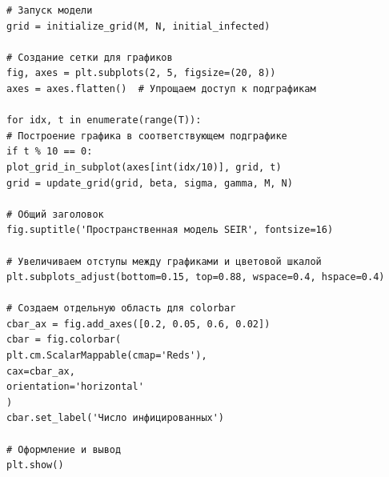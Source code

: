 \documentclass[a4paper, 14pt]{extreport}
\begin{document}
\begin{verbatim}
# Запуск модели
grid = initialize_grid(M, N, initial_infected)

# Создание сетки для графиков
fig, axes = plt.subplots(2, 5, figsize=(20, 8)) 
axes = axes.flatten()  # Упрощаем доступ к подграфикам

for idx, t in enumerate(range(T)):
# Построение графика в соответствующем подграфике
if t % 10 == 0: 
plot_grid_in_subplot(axes[int(idx/10)], grid, t)
grid = update_grid(grid, beta, sigma, gamma, M, N)

# Общий заголовок
fig.suptitle('Пространственная модель SEIR', fontsize=16)

# Увеличиваем отступы между графиками и цветовой шкалой
plt.subplots_adjust(bottom=0.15, top=0.88, wspace=0.4, hspace=0.4)

# Создаем отдельную область для colorbar
cbar_ax = fig.add_axes([0.2, 0.05, 0.6, 0.02])
cbar = fig.colorbar(
plt.cm.ScalarMappable(cmap='Reds'),
cax=cbar_ax,
orientation='horizontal'
)
cbar.set_label('Число инфицированных')

# Оформление и вывод
plt.show()
\end{verbatim}
\end{document}
